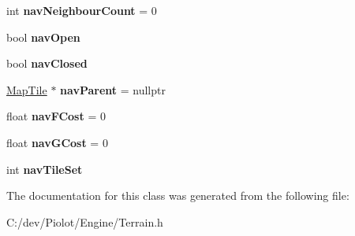 \begin{DoxyCompactItemize}
int {\bfseries nav\+Neighbour\+Count} = 0
\item 
\mbox{\label{classpiolot_1_1_map_tile_ad26177f9ff510ea762454933534bcfd1}} 
bool {\bfseries nav\+Open}
\item 
\mbox{\label{classpiolot_1_1_map_tile_a272716e88eca5a971db3a3f9ea2ccf47}} 
bool {\bfseries nav\+Closed}
\item 
\mbox{\label{classpiolot_1_1_map_tile_aadab9080952f11ef7566b63b46a842a0}} 
\mbox{\hyperlink{classpiolot_1_1_map_tile}{Map\+Tile}} $\ast$ {\bfseries nav\+Parent} = nullptr
\item 
\mbox{\label{classpiolot_1_1_map_tile_ac7792c3dfdb53cabaf7e444910067818}} 
float {\bfseries nav\+F\+Cost} = 0
\item 
\mbox{\label{classpiolot_1_1_map_tile_a87c3aae25887660abd0cb4ee3ee9b973}} 
float {\bfseries nav\+G\+Cost} = 0
\item 
\mbox{\label{classpiolot_1_1_map_tile_a1968deb3bc5f0c4ff4eb05995eff6fd7}} 
int {\bfseries nav\+Tile\+Set}
\end{DoxyCompactItemize}


The documentation for this class was generated from the following file\+:\begin{DoxyCompactItemize}
\item 
C\+:/dev/\+Piolot/\+Engine/Terrain.\+h\end{DoxyCompactItemize}
